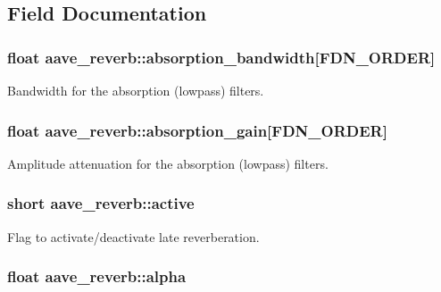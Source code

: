 \subsection{Field Documentation}
\hypertarget{structaave__reverb_ab0c29338df0fe247476f5afed0c78dd8}{
\subsubsection[{absorption\-\_\-bandwidth}]{\setlength{\rightskip}{0pt plus 5cm}float aave\-\_\-reverb\-::absorption\-\_\-bandwidth\mbox{[}{\bf F\-D\-N\-\_\-\-O\-R\-D\-E\-R}\mbox{]}}}\label{structaave__reverb_ab0c29338df0fe247476f5afed0c78dd8}
Bandwidth for the absorption (lowpass) filters. \hypertarget{structaave__reverb_a6f410c8899e7f65ae336f974939fb9f4}{
\subsubsection[{absorption\-\_\-gain}]{\setlength{\rightskip}{0pt plus 5cm}float aave\-\_\-reverb\-::absorption\-\_\-gain\mbox{[}{\bf F\-D\-N\-\_\-\-O\-R\-D\-E\-R}\mbox{]}}}\label{structaave__reverb_a6f410c8899e7f65ae336f974939fb9f4}
Amplitude attenuation for the absorption (lowpass) filters. \hypertarget{structaave__reverb_a117b8425b9574ffd1d6cde92bc0a6de0}{
\subsubsection[{active}]{\setlength{\rightskip}{0pt plus 5cm}short aave\-\_\-reverb\-::active}}\label{structaave__reverb_a117b8425b9574ffd1d6cde92bc0a6de0}
Flag to activate/deactivate late reverberation. \hypertarget{structaave__reverb_a797c24d78e79d4a3bfec25e5a625dc46}{
\subsubsection[{alpha}]{\setlength{\rightskip}{0pt plus 5cm}float aave\-\_\-reverb\-::alpha}}\label{structaave__reverb_a797c24d78e79d4a3bfec25e5a625dc46}
